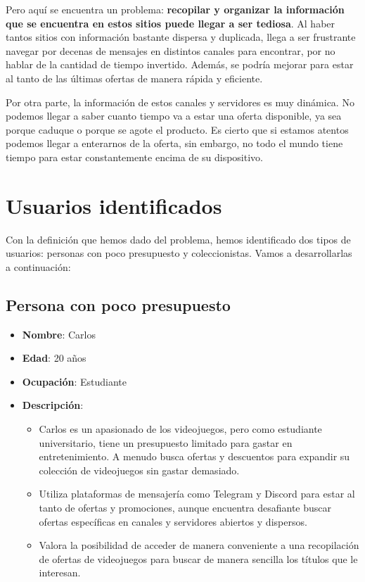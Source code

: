 Pero aquí se encuentra un problema: \textbf{recopilar y organizar la información 
que se encuentra en estos sitios puede llegar a ser tediosa}. Al haber tantos 
sitios con información bastante dispersa y duplicada, llega a ser frustrante 
navegar por decenas de mensajes en distintos canales para encontrar, por no hablar 
de la cantidad de tiempo invertido. Además, se podría mejorar para estar al tanto 
de las últimas ofertas de manera rápida y eficiente.

Por otra parte, la información de estos canales y servidores es muy dinámica. No 
podemos llegar a saber cuanto tiempo va a estar una oferta disponible, ya sea 
porque caduque o porque se agote el producto. Es cierto que si estamos atentos 
podemos llegar a enterarnos de la oferta, sin embargo, no todo el mundo tiene tiempo 
para estar constantemente encima de su dispositivo.

\section{Usuarios identificados}

Con la definición que hemos dado del problema, hemos identificado dos tipos de 
usuarios: personas con poco presupuesto y coleccionistas. Vamos a desarrollarlas 
a continuación:

\subsection{Persona con poco presupuesto}

\begin{itemize}
    \item \textbf{Nombre}: Carlos
    \item \textbf{Edad}: 20 años
    \item \textbf{Ocupación}: Estudiante
    \item \textbf{Descripción}:
    \begin{itemize}
        \item Carlos es un apasionado de los videojuegos, pero como estudiante 
        universitario, tiene un presupuesto limitado para gastar en 
        entretenimiento. A menudo busca ofertas y descuentos para expandir su 
        colección de videojuegos sin gastar demasiado.
        \item Utiliza plataformas de mensajería como Telegram y Discord para estar 
        al tanto de ofertas y promociones, aunque encuentra desafiante buscar 
        ofertas específicas en canales y servidores abiertos y dispersos.
        \item Valora la posibilidad de acceder de manera conveniente a una 
        recopilación de ofertas de videojuegos para buscar de manera sencilla los 
        títulos que le interesan.
    \end{itemize}
\end{itemize}

